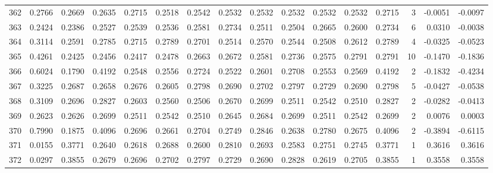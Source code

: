 \begin{tabular}{lrrrrrrrrrrrrrrr}
362 &      0.2766 &  0.2669 &  0.2635 &  0.2715 &  0.2518 &  0.2542 &  0.2532 &  0.2532 &  0.2532 &  0.2532 &   0.2532 &     0.2715 &      3 &                   -0.0051 &                    -0.0097 \\
363 &      0.2424 &  0.2386 &  0.2527 &  0.2539 &  0.2536 &  0.2581 &  0.2734 &  0.2511 &  0.2504 &  0.2665 &   0.2600 &     0.2734 &      6 &                    0.0310 &                    -0.0038 \\
364 &      0.3114 &  0.2591 &  0.2785 &  0.2715 &  0.2789 &  0.2701 &  0.2514 &  0.2570 &  0.2544 &  0.2508 &   0.2612 &     0.2789 &      4 &                   -0.0325 &                    -0.0523 \\
365 &      0.4261 &  0.2425 &  0.2456 &  0.2417 &  0.2478 &  0.2663 &  0.2672 &  0.2581 &  0.2736 &  0.2575 &   0.2791 &     0.2791 &     10 &                   -0.1470 &                    -0.1836 \\
366 &      0.6024 &  0.1790 &  0.4192 &  0.2548 &  0.2556 &  0.2724 &  0.2522 &  0.2601 &  0.2708 &  0.2553 &   0.2569 &     0.4192 &      2 &                   -0.1832 &                    -0.4234 \\
367 &      0.3225 &  0.2687 &  0.2658 &  0.2676 &  0.2605 &  0.2798 &  0.2690 &  0.2702 &  0.2797 &  0.2729 &   0.2690 &     0.2798 &      5 &                   -0.0427 &                    -0.0538 \\
368 &      0.3109 &  0.2696 &  0.2827 &  0.2603 &  0.2560 &  0.2506 &  0.2670 &  0.2699 &  0.2511 &  0.2542 &   0.2510 &     0.2827 &      2 &                   -0.0282 &                    -0.0413 \\
369 &      0.2623 &  0.2626 &  0.2699 &  0.2511 &  0.2542 &  0.2510 &  0.2645 &  0.2684 &  0.2699 &  0.2511 &   0.2542 &     0.2699 &      2 &                    0.0076 &                     0.0003 \\
370 &      0.7990 &  0.1875 &  0.4096 &  0.2696 &  0.2661 &  0.2704 &  0.2749 &  0.2846 &  0.2638 &  0.2780 &   0.2675 &     0.4096 &      2 &                   -0.3894 &                    -0.6115 \\
371 &      0.0155 &  0.3771 &  0.2640 &  0.2618 &  0.2688 &  0.2600 &  0.2810 &  0.2693 &  0.2583 &  0.2751 &   0.2745 &     0.3771 &      1 &                    0.3616 &                     0.3616 \\
372 &      0.0297 &  0.3855 &  0.2679 &  0.2696 &  0.2702 &  0.2797 &  0.2729 &  0.2690 &  0.2828 &  0.2619 &   0.2705 &     0.3855 &      1 &                    0.3558 &                     0.3558 \\

\end{tabular}
